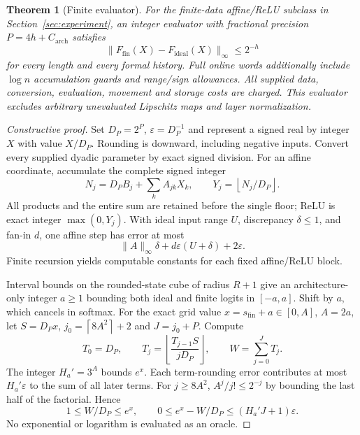 \documentclass[11pt,letterpaper]{article}
\newtheorem{theorem}{Theorem}[section]
\theoremstyle{definition}\newtheorem{definition}[theorem]{Definition}
\theoremstyle{remark}\newtheorem{remark}[theorem]{Remark}
\newcommand{\floor}[1]{\left\lfloor #1\right\rfloor}
\newcommand{\ceil}[1]{\left\lceil #1\right\rceil}
\begin{document}
\begin{theorem}[Finite evaluator]\label{thm:arithmetic}
For the finite-data affine/ReLU subclass in Section~\ref{sec:experiment}, an integer evaluator with fractional precision $P=4h+C_{\mathrm{arch}}$ satisfies
\[
 \|F_{\mathrm{fin}}(X)-F_{\mathrm{ideal}}(X)\|_\infty\le2^{-h}
\]
for every length and every formal history. Full online words additionally include $\log n$ accumulation guards and range/sign allowances. All supplied data, conversion, evaluation, movement and storage costs are charged. This evaluator excludes arbitrary unevaluated Lipschitz maps and layer normalization.
\end{theorem}
\begin{proof}[Constructive proof]
Set $D_P=2^P$, $\varepsilon=D_P^{-1}$ and represent a signed real by integer $X$ with value $X/D_P$. Rounding is downward, including negative inputs. Convert every supplied dyadic parameter by exact signed division. For an affine coordinate, accumulate the complete signed integer
\[
 N_j=D_PB_j+\sum_k A_{jk}X_k,\qquad
 Y_j=\floor{N_j/D_P}.
\]
All products and the entire sum are retained before the single floor; ReLU is exact integer $\max(0,Y_j)$. With ideal input range $U$, discrepancy $\delta\le1$, and fan-in $d$, one affine step has error at most
\[
 \|A\|_\infty\delta+d\varepsilon(U+\delta)+2\varepsilon.
\]
Finite recursion yields computable constants for each fixed affine/ReLU block.

Interval bounds on the rounded-state cube of radius $R+1$ give an architecture-only integer $a\ge1$ bounding both ideal and finite logits in $[-a,a]$. Shift by $a$, which cancels in softmax. For the exact grid value $x=s_{\mathrm{fin}}+a\in[0,A]$, $A=2a$, let $S=D_Px$, $j_0=\ceil{8A^2}+2$ and $J=j_0+P$. Compute
\begin{equation}\label{eq:taylor}
 T_0=D_P,\qquad T_j=\floor{\frac{T_{j-1}S}{jD_P}},\qquad
 W=\sum_{j=0}^{J}T_j.
\end{equation}
The integer $H_a'=3^A$ bounds $e^x$. Each term-rounding error contributes at most $H_a'\varepsilon$ to the sum of all later terms. For $j\ge8A^2$, $A^j/j!\le2^{-j}$ by bounding the last half of the factorial. Hence
\begin{equation}\label{eq:exp}
 1\le W/D_P\le e^x,\qquad
 0\le e^x-W/D_P\le(H_a'J+1)\varepsilon.
\end{equation}
No exponential or logarithm is evaluated as an oracle.


\end{proof}
\end{document}
